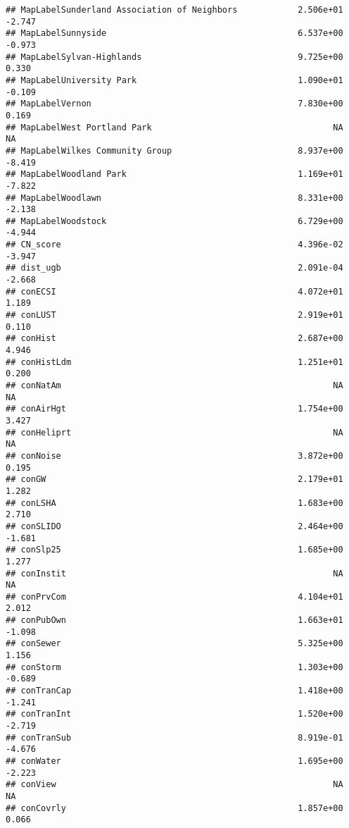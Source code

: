 \documentclass[]{article}
\begin{document}
\begin{verbatim}
## MapLabelSunderland Association of Neighbors            2.506e+01  -2.747
## MapLabelSunnyside                                      6.537e+00  -0.973
## MapLabelSylvan-Highlands                               9.725e+00   0.330
## MapLabelUniversity Park                                1.090e+01  -0.109
## MapLabelVernon                                         7.830e+00   0.169
## MapLabelWest Portland Park                                    NA      NA
## MapLabelWilkes Community Group                         8.937e+00  -8.419
## MapLabelWoodland Park                                  1.169e+01  -7.822
## MapLabelWoodlawn                                       8.331e+00  -2.138
## MapLabelWoodstock                                      6.729e+00  -4.944
## CN_score                                               4.396e-02  -3.947
## dist_ugb                                               2.091e-04  -2.668
## conECSI                                                4.072e+01   1.189
## conLUST                                                2.919e+01   0.110
## conHist                                                2.687e+00   4.946
## conHistLdm                                             1.251e+01   0.200
## conNatAm                                                      NA      NA
## conAirHgt                                              1.754e+00   3.427
## conHeliprt                                                    NA      NA
## conNoise                                               3.872e+00   0.195
## conGW                                                  2.179e+01   1.282
## conLSHA                                                1.683e+00   2.710
## conSLIDO                                               2.464e+00  -1.681
## conSlp25                                               1.685e+00   1.277
## conInstit                                                     NA      NA
## conPrvCom                                              4.104e+01   2.012
## conPubOwn                                              1.663e+01  -1.098
## conSewer                                               5.325e+00   1.156
## conStorm                                               1.303e+00  -0.689
## conTranCap                                             1.418e+00  -1.241
## conTranInt                                             1.520e+00  -2.719
## conTranSub                                             8.919e-01  -4.676
## conWater                                               1.695e+00  -2.223
## conView                                                       NA      NA
## conCovrly                                              1.857e+00   0.066

\end{verbatim}
\end{document}
